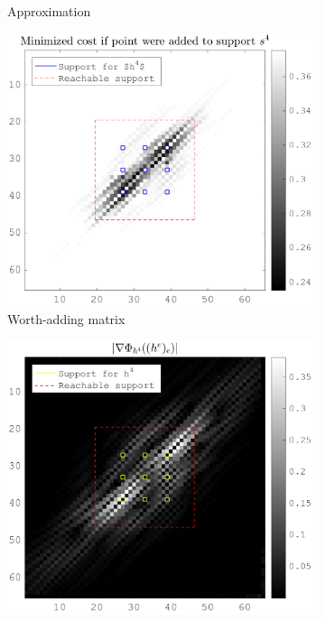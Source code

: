 \begin{figure}[!h]
\begin{subfigure}[b]{0.49\textwidth}
\caption{Approximation} \label{fig_simple_approx}
\end{subfigure}
\begin{subfigure}[b]{0.49\textwidth}\centering
\includegraphics[width=\textwidth]{figures/xp/xp_128x128_sc2_angl1_K3_S3_node4_objmatrix.png}
\caption{Worth-adding matrix}
\end{subfigure}
\begin{subfigure}[b]{0.49\textwidth}\centering
\includegraphics[width=\textwidth]{figures/xp/xp_128x128_sc2_angl1_K3_S3_node4_partgrad4.png}

\end{subfigure}
\end{figure}
